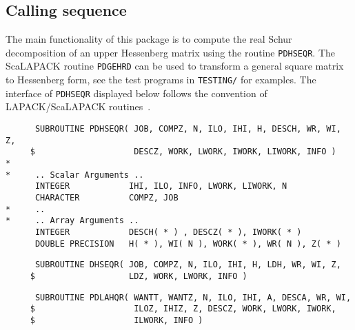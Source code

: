 \documentclass{article}
\begin{document}
\subsection{Calling sequence}
The main functionality of this package is to compute the real Schur
decomposition of an upper Hessenberg matrix using the routine
\texttt{PDHSEQR}.
The
ScaLAPACK routine \texttt{PDGEHRD} can be used to transform a general square matrix to Hessenberg form, see the test programs in \texttt{TESTING/} for
examples.
The interface of \texttt{PDHSEQR} displayed below follows the convention of
LAPACK/ScaLAPACK routines~\cite{LAPACK,ScaLAPACK}. \\
\newsavebox{\verbboxpdhseqr}
\begin{lrbox}{\verbboxpdhseqr}
\begin{minipage}{\textwidth}
\begin{verbatim}
      SUBROUTINE PDHSEQR( JOB, COMPZ, N, ILO, IHI, H, DESCH, WR, WI, Z,
     $                    DESCZ, WORK, LWORK, IWORK, LIWORK, INFO )
*
*     .. Scalar Arguments ..
      INTEGER            IHI, ILO, INFO, LWORK, LIWORK, N
      CHARACTER          COMPZ, JOB
*     ..
*     .. Array Arguments ..
      INTEGER            DESCH( * ) , DESCZ( * ), IWORK( * )
      DOUBLE PRECISION   H( * ), WI( N ), WORK( * ), WR( N ), Z( * )
\end{verbatim}
\end{minipage}
\end{lrbox}
\newsavebox{\verbboxdhseqr}
\begin{lrbox}{\verbboxdhseqr}
\begin{minipage}{\textwidth}
\begin{verbatim}
      SUBROUTINE DHSEQR( JOB, COMPZ, N, ILO, IHI, H, LDH, WR, WI, Z,
     $                   LDZ, WORK, LWORK, INFO )
\end{verbatim}
\end{minipage}
\end{lrbox}
\newsavebox{\verbboxpdlahqr}
\begin{lrbox}{\verbboxpdlahqr}
\begin{minipage}{\textwidth}
\begin{verbatim}
      SUBROUTINE PDLAHQR( WANTT, WANTZ, N, ILO, IHI, A, DESCA, WR, WI,
     $                    ILOZ, IHIZ, Z, DESCZ, WORK, LWORK, IWORK,
     $                    ILWORK, INFO )
\end{verbatim}
\end{minipage}
\end{lrbox}
\medskip
\noindent
\fbox{\usebox{\verbboxpdhseqr}}
\medskip
\end{document}
